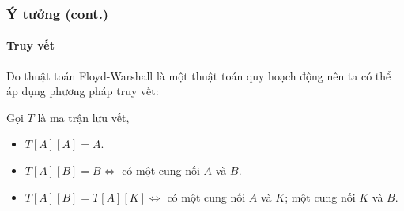 \documentclass[12pt]{beamer}
\begin{document}
    \begin{frame}
        \frametitle{Ý tưởng (cont.)}
        \framesubtitle{Truy vết}
        Do thuật toán Floyd-Warshall là một thuật toán quy hoạch động nên ta có thể áp dụng phương pháp truy vết:

        Gọi $T$ là ma trận lưu vết,\pause
        \begin{itemize}
            \item $T[A][A] = A$.\pause
            \item $T[A][B] = B \iff $ có một cung nối $A$ và $B$.\pause
            \item $T[A][B] = T[A][K]\iff$ có một cung nối $A$ và $K$; một cung nối $K$ và $B$.
        \end{itemize}
    \end{frame}
\end{document}
